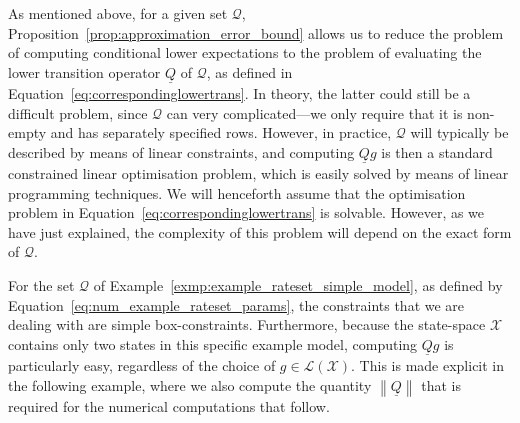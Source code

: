 \documentclass[10pt,a4paper]{paper}
\theoremstyle{definition}
\newcommand{\states}{\mathcal{X}}
\newcommand{\gambles}{\mathcal{L}}
\newcommand{\gamblesX}{\gambles(\states)}
\newcommand{\rateset}{\mathcal{Q}}
\newcommand{\lrate}{\underline{Q}}
\newcommand{\norm}[1]{\left\lVert #1 \right\rVert}
\newcommand{\coloneqq}{:\!=}
\begin{document}
As mentioned above, for a given set $\rateset$, Proposition~\ref{prop:approximation_error_bound} allows us to reduce the problem of computing conditional lower expectations to the problem of evaluating the lower transition operator $\lrate$ of $\rateset$, as defined in Equation~\eqref{eq:correspondinglowertrans}. In theory, the latter could still be a difficult problem, since $\rateset$ can very complicated---we only require that it is non-empty and has separately specified rows. However, in practice, $\rateset$ will typically be described by means of linear constraints, and computing $\lrate g$ is then a standard constrained linear optimisation problem, which is easily solved by means of linear programming techniques. 
We will henceforth assume that the optimisation problem in Equation~\eqref{eq:correspondinglowertrans} is solvable. However, as we have just explained, the complexity of this problem will depend on the exact form of $\rateset$.

For the set $\rateset$ of Example~\ref{exmp:example_rateset_simple_model}, as defined by Equation~\eqref{eq:num_example_rateset_params}, the constraints that we are dealing with are simple box-constraints. Furthermore, because the state-space $\states$ contains only two states in this specific example model, computing $\lrate g$ is particularly easy, regardless of the choice of $g\in\gamblesX$. This is made explicit in the following example, where we also compute the quantity $\norm{\lrate}$ that is required for the numerical computations that follow.
\end{document}
